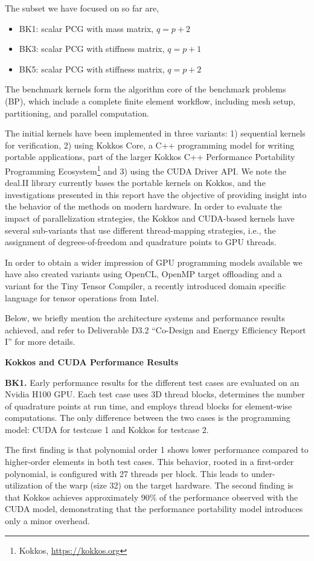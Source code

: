 \documentclass[a4paper,12pt, numbers]{article}
\begin{document}
The subset we have focused on so far are,
\begin{itemize}
\item BK1: scalar PCG with mass matrix, $q = p+2$
\item BK3: scalar PCG with stiffness matrix, $q = p+1$
\item BK5: scalar PCG with stiffness matrix, $q = p+2$
\end{itemize}
The benchmark kernels form the algorithm core of the benchmark problems (BP), which include a complete finite element workflow, including mesh setup, partitioning, and parallel computation.

The initial kernels have been implemented in three variants: 1) sequential kernels for verification, 2) using Kokkos Core, a C++ programming model for writing portable applications, part of the larger Kokkos C++ Performance Portability Programming Ecosystem\footnote{Kokkos, \url{https://kokkos.org}} and 3) using the CUDA Driver API. We note the deal.II library currently bases the portable kernels on Kokkos, and the investigations presented in this report have the objective of providing insight into the behavior of the methods on modern hardware. In order to evaluate the impact of parallelization strategies, the Kokkos and CUDA-based kernels have several sub-variants that use different thread-mapping strategies, i.e., the assignment of degrees-of-freedom and quadrature points to GPU threads.

In order to obtain a wider impression of GPU programming models available we have also created variants using OpenCL, OpenMP target offloading and a variant for the Tiny Tensor Compiler, a recently introduced domain specific language for tensor operations from Intel. 

Below, we briefly mention the architecture systems and performance results achieved, and refer to Deliverable D3.2 ``Co-Design and Energy Efficiency Report I'' for more details.

\noindent\textbf{Kokkos and CUDA Performance Results}

{\bf BK1.} Early performance results for the different test cases are evaluated on an Nvidia H100 GPU. Each test case uses 3D thread blocks, determines the number of quadrature points at run time, and employs thread blocks for element-wise computations. The only difference between the two cases is the programming model: CUDA for testcase 1 and Kokkos for testcase 2. 

The first finding is that polynomial order 1 shows lower performance compared to higher-order elements in both test cases. This behavior, rooted in a first-order polynomial, is configured with 27 threads per block. This leads to under-utilization of the warp (size 32) on the target hardware. The second finding is that Kokkos achieves approximately 90\% of the performance observed with the CUDA model, demonstrating that the performance portability model introduces only a minor overhead.
\end{document}
